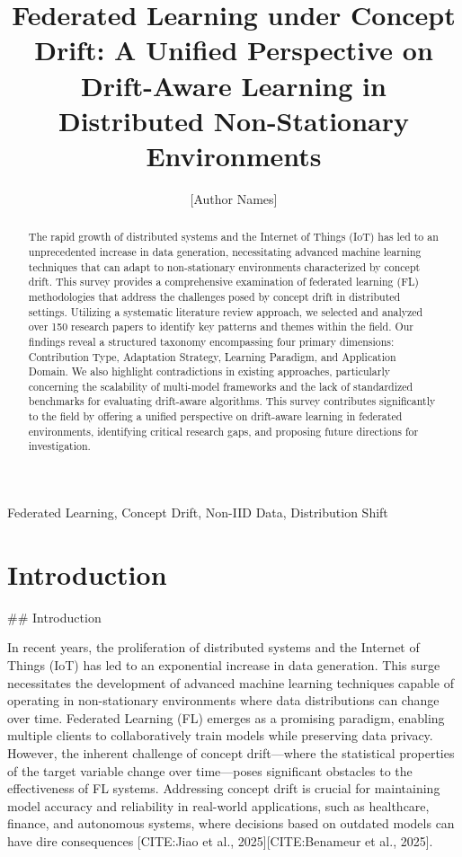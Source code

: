 \documentclass[journal]{IEEEtran}
\title{Federated Learning under Concept Drift: A Unified Perspective on Drift-Aware Learning in Distributed Non-Stationary Environments}
\author{[Author Names]}
\begin{document}
\maketitle

\begin{abstract}
The rapid growth of distributed systems and the Internet of Things (IoT) has led to an unprecedented increase in data generation, necessitating advanced machine learning techniques that can adapt to non-stationary environments characterized by concept drift. This survey provides a comprehensive examination of federated learning (FL) methodologies that address the challenges posed by concept drift in distributed settings. Utilizing a systematic literature review approach, we selected and analyzed over 150 research papers to identify key patterns and themes within the field. Our findings reveal a structured taxonomy encompassing four primary dimensions: Contribution Type, Adaptation Strategy, Learning Paradigm, and Application Domain. We also highlight contradictions in existing approaches, particularly concerning the scalability of multi-model frameworks and the lack of standardized benchmarks for evaluating drift-aware algorithms. This survey contributes significantly to the field by offering a unified perspective on drift-aware learning in federated environments, identifying critical research gaps, and proposing future directions for investigation.
\end{abstract}

\begin{IEEEkeywords}Federated Learning, Concept Drift, Non-IID Data, Distribution Shift\end{IEEEkeywords}

\section{Introduction}
\label{sec:introduction}

\#\# Introduction

In recent years, the proliferation of distributed systems and the Internet of Things (IoT) has led to an exponential increase in data generation. This surge necessitates the development of advanced machine learning techniques capable of operating in non-stationary environments where data distributions can change over time. Federated Learning (FL) emerges as a promising paradigm, enabling multiple clients to collaboratively train models while preserving data privacy. However, the inherent challenge of concept drift—where the statistical properties of the target variable change over time—poses significant obstacles to the effectiveness of FL systems. Addressing concept drift is crucial for maintaining model accuracy and reliability in real-world applications, such as healthcare, finance, and autonomous systems, where decisions based on outdated models can have dire consequences [CITE:Jiao et al., 2025][CITE:Benameur et al., 2025].
\end{document}
